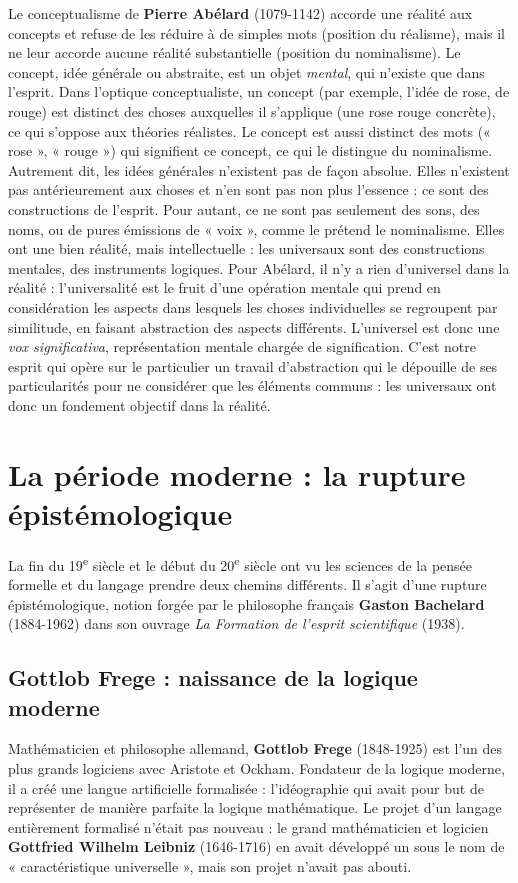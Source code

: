 Le conceptualisme de \textbf{Pierre Abélard} (1079-1142) accorde une réalité aux concepts et refuse de les réduire à de simples mots (position du réalisme), mais il ne leur accorde aucune réalité substantielle (position du nominalisme). Le concept, idée générale ou abstraite, est un objet \textit{mental}, qui n’existe que dans l’esprit. Dans l’optique conceptualiste, un concept (par exemple, l’idée de rose, de rouge) est distinct des choses auxquelles il s’applique (une rose rouge concrète), ce qui s’oppose aux théories réalistes. Le concept est aussi distinct des mots (« rose », « rouge ») qui signifient ce concept, ce qui le distingue du nominalisme. Autrement dit, les idées générales n’existent pas de façon absolue. Elles n’existent pas antérieurement aux choses et n’en sont pas non plus l’essence : ce sont des constructions de l’esprit. Pour autant, ce ne sont pas seulement des sons, des noms, ou de pures émissions de « voix », comme le prétend le nominalisme. Elles ont une bien réalité, mais intellectuelle : les universaux sont des constructions mentales, des instruments logiques. Pour Abélard, il n’y a rien d’universel dans la réalité : l’universalité est le fruit d’une opération mentale qui prend en considération les aspects dans lesquels les choses individuelles se regroupent par similitude, en faisant abstraction des aspects différents. L’universel est donc une \textit{vox significativa}, représentation mentale chargée de signification. C’est notre esprit qui opère sur le particulier un travail d’abstraction qui le dépouille de ses particularités pour ne considérer que les éléments communs : les universaux ont donc un fondement objectif dans la réalité.

\section{La période moderne : la rupture épistémologique}
La fin du 19\textsuperscript{e} siècle et le début du 20\textsuperscript{e} siècle ont vu les sciences de la pensée formelle et du langage prendre deux chemins différents. Il s’agit d’une rupture épistémologique, notion forgée par le philosophe français \textbf{Gaston Bachelard} (1884-1962) dans son ouvrage \textit{La Formation de l’esprit scientifique} (1938).

\subsection{Gottlob Frege : naissance de la logique moderne}
Mathématicien et philosophe allemand, \textbf{Gottlob Frege} (1848-1925) est l’un des plus grands logiciens avec Aristote et Ockham. Fondateur de la logique moderne, il a créé une langue artificielle formalisée : l’idéographie qui avait pour but de représenter de manière parfaite la logique mathématique. Le projet d’un langage entièrement formalisé n’était pas nouveau : le grand mathématicien et logicien \textbf{Gottfried Wilhelm Leibniz} (1646-1716) en avait développé un sous le nom de « caractéristique universelle », mais son projet n’avait pas abouti.

